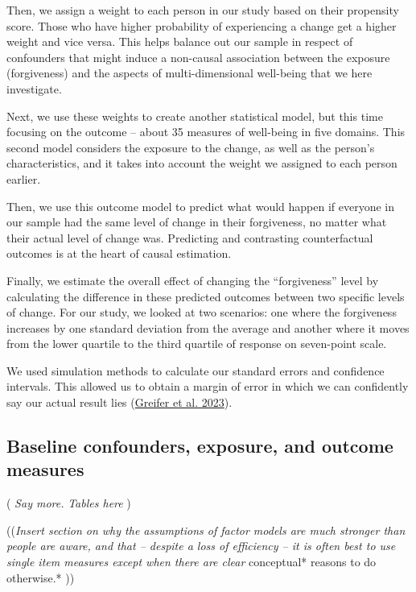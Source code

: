 \documentclass[
  singlecolumn]{report}
\begin{document}
Then, we assign a weight to each person in our study based on their
propensity score. Those who have higher probability of experiencing a
change get a higher weight and vice versa. This helps balance out our
sample in respect of confounders that might induce a non-causal
association between the exposure (forgiveness) and the aspects of
multi-dimensional well-being that we here investigate.

Next, we use these weights to create another statistical model, but this
time focusing on the outcome -- about 35 measures of well-being in five
domains. This second model considers the exposure to the change, as well
as the person's characteristics, and it takes into account the weight we
assigned to each person earlier.

Then, we use this outcome model to predict what would happen if everyone
in our sample had the same level of change in their forgiveness, no
matter what their actual level of change was. Predicting and contrasting
counterfactual outcomes is at the heart of causal estimation.

Finally, we estimate the overall effect of changing the ``forgiveness''
level by calculating the difference in these predicted outcomes between
two specific levels of change. For our study, we looked at two
scenarios: one where the forgiveness increases by one standard deviation
from the average and another where it moves from the lower quartile to
the third quartile of response on seven-point scale.

We used simulation methods to calculate our standard errors and
confidence intervals. This allowed us to obtain a margin of error in
which we can confidently say our actual result lies
(\protect\hyperlink{ref-greifer2023}{Greifer et al. 2023}).

\hypertarget{baseline-confounders-exposure-and-outcome-measures}{%
\subsection{Baseline confounders, exposure, and outcome
measures}\label{baseline-confounders-exposure-and-outcome-measures}}

( \emph{Say more.} \emph{Tables here} )

((\emph{Insert section on why the assumptions of factor models are much
stronger than people are aware, and that -- despite a loss of efficiency
-- it is often best to use single item measures except when there are
clear} conceptual* reasons to do otherwise.* ))
\end{document}
